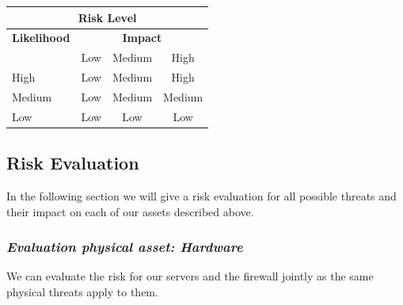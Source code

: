 \documentclass[english]{article}
\begin{document}
\vspace{5mm}

\begin{center}
\begin{tabular}{|l|c|c|c|}
\hline
\multicolumn{4}{|c|}{{\bf Risk Level}} \\
\hline
{{\bf Likelihood}} & \multicolumn{3}{c|}{{\bf Impact}} \\ \cline{2-4}
     & Low & Medium & High \\  \hline
 High & Low & Medium & High  \\
\hline
 Medium & Low & Medium & Medium \\
\hline
 Low & Low & Low & Low \\
\hline
\end{tabular}
\end{center}


\subsection{Risk Evaluation}



In the following section we will give a risk evaluation for all possible threats and their impact on each of our assets described above. 


\subsubsection{{\it Evaluation physical asset: Hardware}}


We can evaluate the risk for our servers and the firewall jointly as the same physical threats apply to them.
\end{document}

